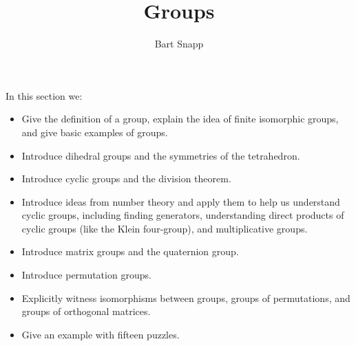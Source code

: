 \documentclass{ximera}
\author{Bart Snapp}
\title{Groups}
\begin{document}
\begin{abstract}
\end{abstract}
\maketitle
In this section we:

\begin{itemize}
\item Give the definition of a group, explain the idea of finite
  isomorphic groups, and give basic examples of groups.
\item Introduce dihedral groups and the symmetries of the tetrahedron.
\item Introduce cyclic groups and the division theorem.
\item Introduce ideas from number theory and apply them to help us
  understand cyclic groups, including finding generators,
  understanding direct products of cyclic groups (like the Klein
  four-group), and multiplicative groups.
\item Introduce matrix groups and the quaternion group.
\item Introduce permutation groups.
\item Explicitly witness isomorphisms between groups, groups of
  permutations, and groups of orthogonal matrices.
\item Give an example with fifteen puzzles.
\end{itemize}
\end{document}
